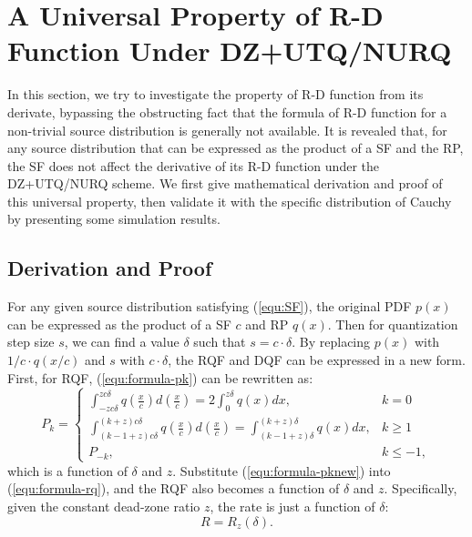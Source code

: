 \documentclass[smallabstract,smallcaptions]{dccpaper}
\begin{document}
\section{A Universal Property of R-D Function Under DZ+UTQ/NURQ}
\label{sec:property}

In this section, we try to investigate the property of R-D function from its derivate, bypassing the obstructing fact that the formula of R-D function for a non-trivial source distribution is generally not available. It is revealed that, for any source distribution that can be expressed as the product of a SF and the RP, the SF does not affect the derivative of its R-D function under the DZ+UTQ/NURQ scheme. We first give mathematical derivation and proof of this universal property, then validate it with the specific distribution of Cauchy by presenting some simulation results.

\subsection{Derivation and Proof}

For any given source distribution satisfying (\ref{equ:SF}), the original PDF $p(x)$ can be expressed as the product of a SF $c$ and RP $q(x)$. Then for quantization step size $s$, we can find a value $\delta$ such that $s=c \cdot \delta$. By replacing $p(x)$ with $1/c \cdot q(x/c)$ and $s$ with $c \cdot \delta$, the RQF and DQF can be expressed in a new form. First, for RQF, (\ref{equ:formula-pk}) can be rewritten as:
\begin{equation}\label{equ:formula-pknew}
	P_k =
	\begin{cases}
		\int_{-z c\delta}^{z c\delta} q\left(\frac{x}{c}\right) d\left(\frac{x}{c}\right)
		= 2 \int_{0}^{z \delta} q(x) dx,
		& k=0 \\
		\int_{(k-1+z) c\delta}^{(k+z) c\delta} q\left(\frac{x}{c}\right) d\left(\frac{x}{c}\right)
		=\int_{(k-1+z) \delta}^{(k+z) \delta} q(x) dx,
		& k \ge 1 \\
		P_{-k},
		& k \le -1 ,
	\end{cases}
\end{equation} 
which is a function of $\delta$ and $z$. Substitute (\ref{equ:formula-pknew}) into (\ref{equ:formula-rq}), and the RQF also becomes a function of $\delta$ and $z$. Specifically, given the constant dead-zone ratio $z$, the rate is just a function of $\delta$: 
\begin{equation}\label{equ:formula-rqnew}
	R = R_z(\delta).
\end{equation}
\end{document}

